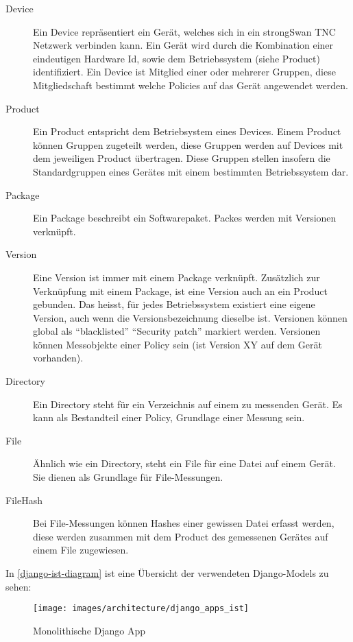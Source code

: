 \begin{description}
	\item[Device] Ein Device repräsentiert ein Gerät, welches sich in ein
	strongSwan TNC Netzwerk verbinden kann. Ein Gerät wird durch die Kombination
	einer eindeutigen Hardware Id, sowie dem Betriebssystem (siehe Product)
	identifiziert. Ein Device ist Mitglied einer oder mehrerer Gruppen, diese
	Mitgliedschaft bestimmt welche Policies auf das Gerät angewendet werden.
	
	\item[Product] Ein Product entspricht dem Betriebsystem eines Devices. Einem
	Product können Gruppen zugeteilt werden, diese Gruppen werden auf Devices mit
	dem jeweiligen Product übertragen. Diese Gruppen stellen insofern die
	Standardgruppen eines Gerätes mit einem bestimmten Betriebssystem dar.
	
	\item[Package] Ein Package beschreibt ein Softwarepaket. Packes werden mit Versionen verknüpft.
	
	\item[Version] Eine Version ist immer mit einem Package verknüpft. 
	Zusätzlich zur Verknüpfung mit einem Package, ist eine Version auch an ein Product gebunden.
	Das heisst, für jedes Betriebssystem existiert eine eigene Version, auch wenn die Versionsbezeichnung dieselbe ist.
	Versionen können global als \enquote{blacklisted} \enquote{Security patch} markiert werden.
	Versionen können Messobjekte einer Policy sein (ist Version XY auf dem Gerät vorhanden).
		
	\item[Directory] Ein Directory steht für ein Verzeichnis auf einem zu messenden
	Gerät. Es kann als Bestandteil einer Policy, Grundlage einer Messung sein.
	
	\item[File] Ähnlich wie ein Directory, steht ein File für eine Datei auf einem
	Gerät. Sie dienen als Grundlage für File-Messungen.
	
	\item[FileHash] Bei File-Messungen können Hashes einer gewissen Datei erfasst
	werden, diese werden zusammen mit dem Product des gemessenen Gerätes auf einem
	File zugewiesen.
	
\end{description}

In \autoref{django-ist-diagram} ist eine Übersicht der verwendeten Django-Models
zu sehen:
\begin{figure}[H]
	\centering
	\texttt{[image: images/architecture/django\_apps\_ist]}
    \caption{Monolithische Django App}
    \label{django-ist-diagram}
\end{figure}

